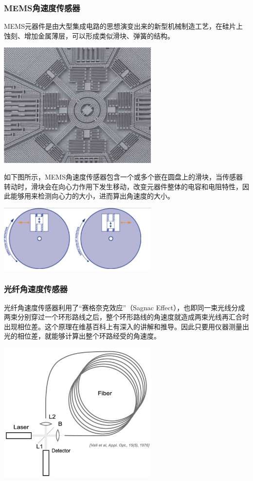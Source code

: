 \documentclass[11pt]{article}
\begin{document}
\subsubsection{MEMS角速度传感器}
MEMS元器件是由大型集成电路的思想演变出来的新型机械制造工艺，在硅片上蚀刻、增加金属薄层，可以形成类似滑块、弹簧的结构。

\begin{center}
\includegraphics[width=0.6\textwidth]{images/memsgyro0.jpg}
\end{center}

如下图所示，MEMS角速度传感器包含一个或多个嵌在圆盘上的滑块，当传感器转动时，滑块会在向心力作用下发生移动，改变元器件整体的电容和电阻特性，因此能够用来检测向心力的大小，进而算出角速度的大小。

\begin{center}
\includegraphics[width=0.6\textwidth]{images/memsgyro.png}
\end{center}
\subsubsection{光纤角速度传感器}
光纤角速度传感器利用了“赛格奈克效应”（Sagnac Effect），也即同一束光线分成两束分别穿过一个环形路线之后，整个环形路线的角速度就造成两束光线再汇合时出现相位差。这个原理在维基百科上有深入的讲解和推导。因此只要用仪器测量出光的相位差，就能够计算出整个环路经受的角速度。

\begin{center}
\includegraphics[width=0.6\textwidth]{images/sagnaceffect.jpg}
\end{center}
\end{document}

